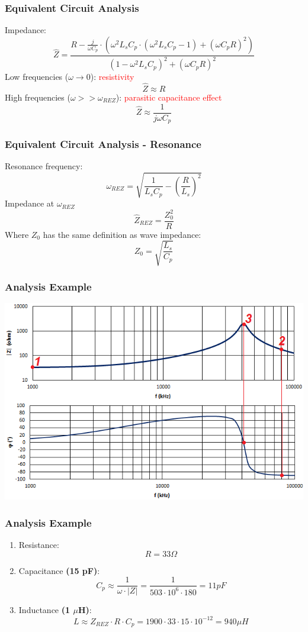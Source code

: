 \documentclass{beamer}
\begin{document}
	\begin{frame}
    \frametitle{Equivalent Circuit Analysis}
		Impedance: 
		$$\hat{Z}= \frac{R - \frac{j}{\omega C_p}\cdot\left(\omega^2 L_sC_p\cdot\left(\omega^2 L_sC_p - 1\right)+\left(\omega C_pR\right)^2\right)}{\left(1-\omega^2 L_sC_p\right)^2+\left(\omega C_pR\right)^2}$$
		Low frequencies ($\omega \rightarrow 0$): \textcolor{red}{resistivity}
		$$\hat{Z}\approx R$$
		High frequencies ($\omega >> \omega_{REZ}$): \textcolor{red}{parasitic capacitance effect}
		$$\hat{Z}\approx \frac{1}{j\omega C_p}$$
	\end{frame}
	\begin{frame}
    \frametitle{Equivalent Circuit Analysis - Resonance}
		Resonance frequency:
		$$\omega_{REZ}= \sqrt{\frac{1}{L_sC_p} - \left(\frac{R}{L_s}\right)^2}$$
		Impedance at $\omega_{REZ}$
		$$\hat{Z}_{REZ}=\frac{Z_0^2}{R}$$
		Where $Z_0$ has the same definition as wave impedance:
		$$Z_0 = \sqrt{\frac{L_s}{C_p}}$$
	\end{frame}
	\begin{frame}
    \frametitle{Analysis Example}
		
		\begin{center}
			\includegraphics[scale=0.6]{obr06_prikladR.png}
		\end{center}
	\end{frame}
	\begin{frame}
    \frametitle{Analysis Example}
		
		\begin{enumerate}
		\setcounter{enumi}{0}
			\item Resistance: $$R= 33\Omega$$
			\item Capacitance \textbf{(15 pF)}: $$C_p\approx \frac{1}{\omega \cdot \left|Z\right|}= \frac{1}{503\cdot 10^6\cdot180}= 11pF$$
			\item Inductance \textbf{(1 $\mu$H)}: $$L\approx Z_{REZ}\cdot R \cdot C_p = 1900\cdot 33\cdot 15\cdot 10^{-12}= 940 \mu H$$
		\end{enumerate}
	\end{frame}
\end{document}
